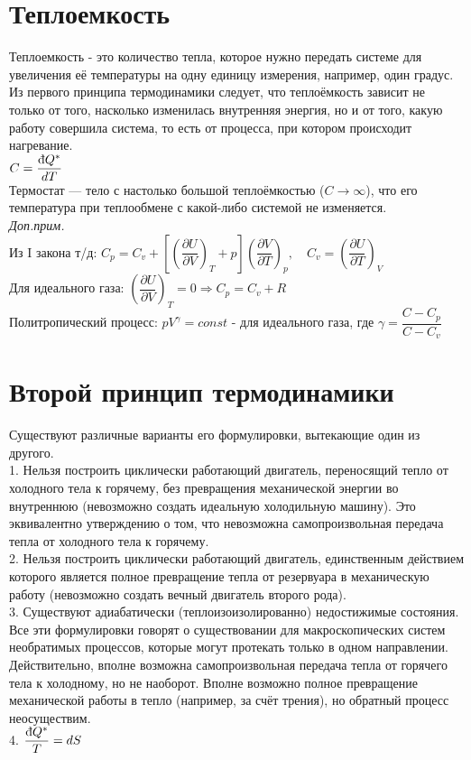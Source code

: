\begin{multicols*}{2}
		\section{Теплоемкость}
		Теплоемкость - это количество тепла, которое нужно передать системе для увеличения её температуры на одну единицу измерения, например, один градус. Из первого принципа термодинамики следует, что теплоёмкость зависит не только от того, насколько изменилась внутренняя энергия, но и от того, какую работу совершила система, то есть от процесса, при котором происходит нагревание.\\
		$C = \dfrac{\mbox{\dj} Q^*}{dT}$\\
		Термостат — тело с настолько большой теплоёмкостью ($C \rightarrow \infty$), что его температура при теплообмене с какой-либо системой не изменяется.\\
		\textit{Доп.прим.}\\
		Из I закона т/д: $C_p = C_v + \left[\left(\dfrac{\partial U}{\partial V}\right)_T + p\right]\left(\dfrac{\partial V}{\partial T}\right)_p, \quad C_v = \left(\dfrac{\partial U}{\partial T}\right)_V$\\
		Для идеального газа: $\left(\dfrac{\partial U}{\partial V}\right)_T = 0 \Rightarrow C_p = C_v + R$\\
		Политропический процесс: $pV^\gamma = const$ - для идеального газа, где $\gamma = \dfrac{C - C_p}{C - C_v}$\\

		\section{Второй принцип термодинамики}
		Существуют различные варианты его формулировки, вытекающие один из другого.\\
		1. Нельзя построить циклически работающий двигатель, переносящий тепло от холодного тела к горячему, без превращения механической энергии во внутреннюю (невозможно создать идеальную холодильную машину). Это эквивалентно утверждению о том, что невозможна самопроизвольная передача тепла от холодного тела к горячему.\\
		2. Нельзя построить циклически работающий двигатель, единственным действием которого является полное превращение тепла от резервуара в механическую работу (невозможно создать вечный двигатель второго рода).\\
		3. Существуют адиабатически (теплоизоизолированно) недостижимые состояния.\\
		Все эти формулировки говорят о существовании для макроскопических систем необратимых процессов, которые могут протекать только в одном направлении. Действительно, вполне возможна самопроизвольная передача тепла от горячего тела к холодному, но не наоборот. Вполне возможно полное превращение механической работы в тепло (например, за счёт трения), но обратный процесс неосуществим.\\
		4. $\dfrac{\mbox{\dj} Q^*}{T} = dS$\\


\end{multicols*}

